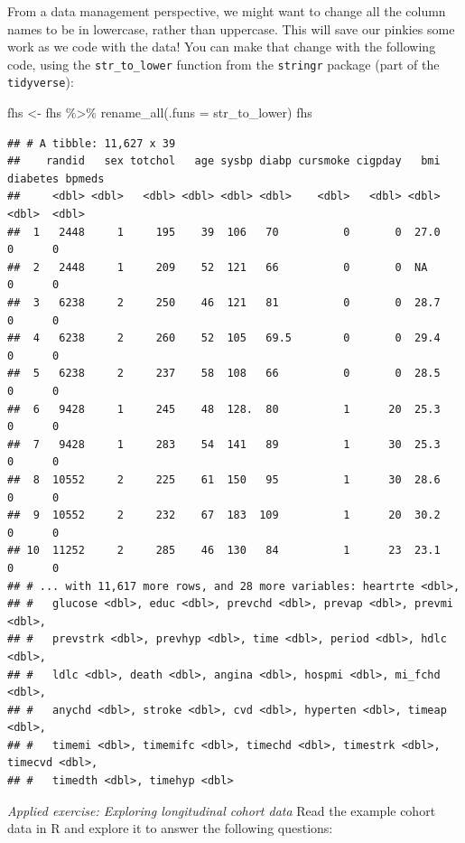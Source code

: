 \documentclass[
]{book}
\newenvironment{Shaded}{\begin{snugshade}}{\end{snugshade}}
\newcommand{\AttributeTok}[1]{\textcolor[rgb]{0.77,0.63,0.00}{#1}}
\newcommand{\FunctionTok}[1]{\textcolor[rgb]{0.00,0.00,0.00}{#1}}
\newcommand{\NormalTok}[1]{#1}
\newcommand{\OtherTok}[1]{\textcolor[rgb]{0.56,0.35,0.01}{#1}}
\newcommand{\SpecialCharTok}[1]{\textcolor[rgb]{0.00,0.00,0.00}{#1}}
\begin{document}
From a data management perspective, we might want to change all the column names
to be in lowercase, rather than uppercase. This will save our pinkies some
work as we code with the data! You can make that change with the following
code, using the \texttt{str\_to\_lower} function from the \texttt{stringr} package (part of
the \texttt{tidyverse}):

\begin{Shaded}
\begin{Highlighting}[]
\NormalTok{fhs }\OtherTok{\textless{}{-}}\NormalTok{ fhs }\SpecialCharTok{\%\textgreater{}\%} 
  \FunctionTok{rename\_all}\NormalTok{(}\AttributeTok{.funs =}\NormalTok{ str\_to\_lower)}
\NormalTok{fhs}
\end{Highlighting}
\end{Shaded}

\begin{verbatim}
## # A tibble: 11,627 x 39
##    randid   sex totchol   age sysbp diabp cursmoke cigpday   bmi diabetes bpmeds
##     <dbl> <dbl>   <dbl> <dbl> <dbl> <dbl>    <dbl>   <dbl> <dbl>    <dbl>  <dbl>
##  1   2448     1     195    39  106   70          0       0  27.0        0      0
##  2   2448     1     209    52  121   66          0       0  NA          0      0
##  3   6238     2     250    46  121   81          0       0  28.7        0      0
##  4   6238     2     260    52  105   69.5        0       0  29.4        0      0
##  5   6238     2     237    58  108   66          0       0  28.5        0      0
##  6   9428     1     245    48  128.  80          1      20  25.3        0      0
##  7   9428     1     283    54  141   89          1      30  25.3        0      0
##  8  10552     2     225    61  150   95          1      30  28.6        0      0
##  9  10552     2     232    67  183  109          1      20  30.2        0      0
## 10  11252     2     285    46  130   84          1      23  23.1        0      0
## # ... with 11,617 more rows, and 28 more variables: heartrte <dbl>,
## #   glucose <dbl>, educ <dbl>, prevchd <dbl>, prevap <dbl>, prevmi <dbl>,
## #   prevstrk <dbl>, prevhyp <dbl>, time <dbl>, period <dbl>, hdlc <dbl>,
## #   ldlc <dbl>, death <dbl>, angina <dbl>, hospmi <dbl>, mi_fchd <dbl>,
## #   anychd <dbl>, stroke <dbl>, cvd <dbl>, hyperten <dbl>, timeap <dbl>,
## #   timemi <dbl>, timemifc <dbl>, timechd <dbl>, timestrk <dbl>, timecvd <dbl>,
## #   timedth <dbl>, timehyp <dbl>
\end{verbatim}

\emph{Applied exercise: Exploring longitudinal cohort data}
Read the example cohort data in R and explore it to answer the following
questions:
\end{document}
